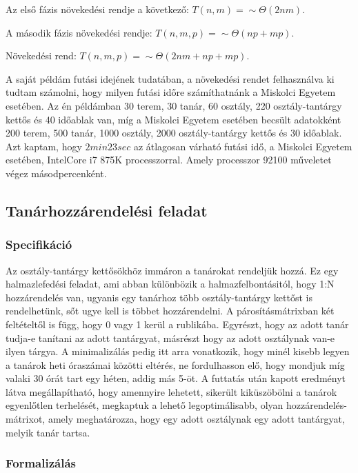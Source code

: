 \documentclass[12pt,a4paper]{report}
\begin{document}
Az első fázis növekedési rendje a következő: $T(n,m)=\sim \Theta (2nm).$

A második fázis növekedési rendje: $T(n,m,p)=\sim \Theta (np+mp).$

Növekedési rend: $T(n,m,p)=\sim \Theta (2nm+np+mp).$

A saját példám futási idejének tudatában, a növekedési rendet felhasználva ki tudtam számolni, hogy milyen futási időre számíthatnánk a Miskolci Egyetem esetében. Az én példámban 30 terem, 30 tanár, 60 osztály, 220 osztály-tantárgy kettős és 40 időablak van, míg a Miskolci Egyetem esetében becsült adatokként 200 terem, 500 tanár, 1000 osztály, 2000 osztály-tantárgy kettős és 30 időablak. Azt kaptam, hogy $2min 23sec$ az átlagosan várható futási idő, a Miskolci Egyetem esetében, IntelCore i7 875K processzorral. Amely processzor 92100 műveletet végez másodpercenként.

\subsection{Tanárhozzárendelési feladat}

\subsubsection{Specifikáció}

Az osztály-tantárgy kettősökhöz immáron a tanárokat rendeljük hozzá. Ez egy halmazlefedési feladat, ami abban különbözik a halmazfelbontásitól, hogy 1:N hozzárendelés van, ugyanis egy tanárhoz több osztály-tantárgy kettőst is rendelhetünk, sőt ugye kell is többet hozzárendelni. A párosításmátrixban két feltételtől is függ, hogy 0 vagy 1 kerül a rublikába. Egyrészt, hogy az adott tanár tudja-e tanítani az adott tantárgyat, másrészt hogy az adott osztálynak van-e ilyen tárgya.
A minimalizálás pedig itt arra vonatkozik, hogy minél kisebb legyen a tanárok heti óraszámai közötti eltérés, ne fordulhasson elő, hogy mondjuk míg valaki 30 órát tart egy héten, addig más 5-öt.
A futtatás után kapott eredményt látva megállapítható, hogy amennyire lehetett, sikerült kiküszöbölni a tanárok egyenlőtlen terhelését, megkaptuk a lehető legoptimálisabb, olyan hozzárendelés-mátrixot, amely meghatározza, hogy egy adott osztálynak egy adott tantárgyat, melyik tanár tartsa.

\subsubsection{Formalizálás}
\end{document}
